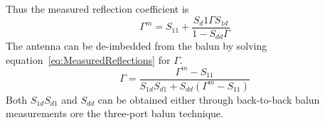 \documentclass[preprint]{aastex}
\begin{document}
 Thus the measured reflection coefficient is 
 \begin{equation}\label{eq:MeasuredReflections}
\Gamma^m = S_{11} + \frac{{S_d1}\Gamma S_{1d}}{1-S_{dd} \Gamma}
 \end{equation}
 The antenna can be de-imbedded from the balun by solving equation~\ref{eq:MeasuredReflections} for $\Gamma$. 
 \begin{equation}
 \Gamma = \frac{\Gamma^m - S_{11}}{S_{1d}S_{d1} + S_{dd}\left(\Gamma^m-S_{11}\right)}
 \end{equation}
 Both $S_{1d}S_{d1}$ and $S_{dd}$ can be obtained either through back-to-back balun measurements ore the three-port balun technique. 
\end{document}
